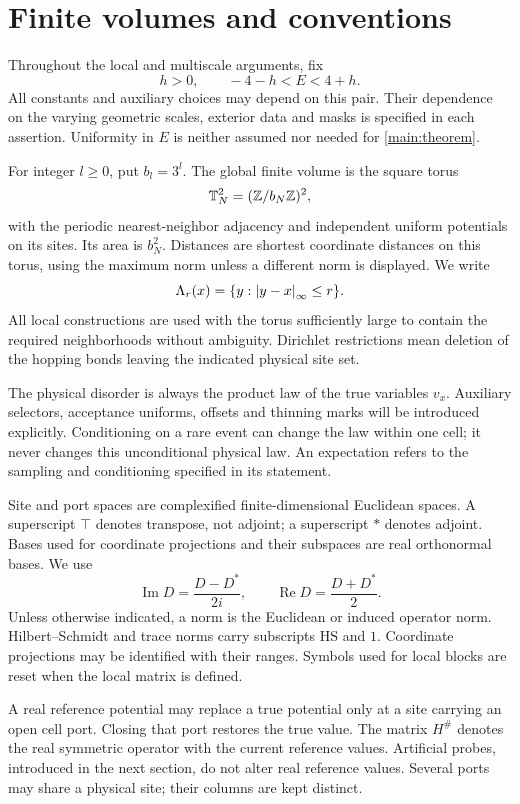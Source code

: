 \section{Finite volumes and conventions}\label{setup:conventions}

Throughout the local and multiscale arguments, fix
\begin{equation}\label{setup:fixed-energy}
 h>0,\qquad -4-h<E<4+h.
\end{equation}
All constants and auxiliary choices may depend on this pair. Their
dependence on the varying geometric scales, exterior data and masks is
specified in each assertion. Uniformity in $E$ is neither assumed nor
needed for \cref{main:theorem}.

For integer $l\ge0$, put $b_l=3^l$. The global finite volume is the square
torus
\[
 \mathbb T_N^2=(\mathbb Z/b_N\mathbb Z)^2,
\]
with the periodic nearest-neighbor adjacency and independent uniform
potentials on its sites. Its area is $b_N^2$. Distances are shortest
coordinate distances on this torus, using the maximum norm unless a
different norm is displayed. We write
\[
 \Lambda_r(x)=\{y:\left\lvert y-x\right\rvert_\infty\le r\}.
\]
All local constructions are used with the torus sufficiently large to
contain the required neighborhoods without ambiguity. Dirichlet
restrictions mean deletion of the hopping bonds leaving the indicated
physical site set.

The physical disorder is always the product law of the true variables
$v_x$. Auxiliary selectors, acceptance uniforms, offsets and thinning
marks will be introduced explicitly. Conditioning on a rare event can
change the law within one cell; it never changes this unconditional
physical law. An expectation refers to the sampling and conditioning
specified in its statement.

Site and port spaces are complexified finite-dimensional Euclidean
spaces. A superscript $\top$ denotes transpose, not adjoint; a superscript
$*$ denotes adjoint. Bases used for coordinate projections and their
subspaces are real orthonormal bases. We use
\[
 \operatorname{Im}D=\frac{D-D^*}{2i},\qquad
 \operatorname{Re}D=\frac{D+D^*}{2}.
\]
Unless otherwise indicated, a norm is the Euclidean or induced operator
norm. Hilbert--Schmidt and trace norms carry subscripts $\mathrm{HS}$
and $1$. Coordinate projections may be identified with their ranges.
Symbols used for local blocks are reset when the local matrix is defined.

A real reference potential may replace a true potential only at a site
carrying an open cell port. Closing that port restores the true value.
The matrix $H^\#$ denotes the real symmetric operator with the current
reference values. Artificial probes, introduced in the next section, do
not alter real reference values. Several ports may share a physical site;
their columns are kept distinct.

